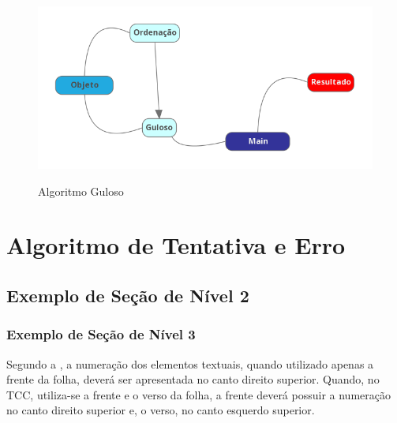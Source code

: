 \begin{figure}[htb!]
    \centering
    \caption{Algoritmo Guloso}
    \includegraphics[keepaspectratio=true,scale=0.8]
    	{img/GULOSO.png}
    \label{fig:elementos}
\end{figure}



\section{Algoritmo de Tentativa e Erro}
\label{sec:textual}







\subsection{Exemplo de Seção de Nível 2}
\subsubsection{Exemplo de Seção de Nível 3}

Segundo a \cite{abntTxtAcad2011}, a numeração dos elementos textuais, quando utilizado apenas a frente da folha, deverá ser apresentada no canto direito superior. Quando, no TCC, utiliza-se a frente e o verso da folha, a frente deverá possuir a numeração no canto direito superior e, o verso, no canto esquerdo superior.

